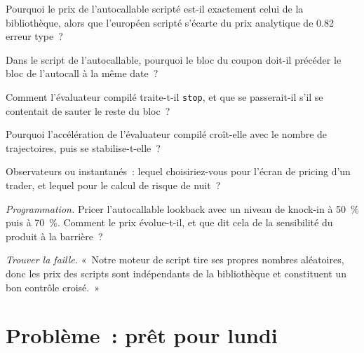 \begin{exercise}[$\star$]\label{exo:pl:pricing-library-architecture:2}
Pourquoi le prix de l'autocallable scripté est-il exactement celui de la bibliothèque, alors que l'européen scripté s'écarte du prix analytique de 0.82
erreur type~?
\end{exercise}

\begin{exercise}[$\star$]\label{exo:pl:pricing-library-architecture:3}
Dans le script de l'autocallable, pourquoi le bloc du coupon doit-il précéder le bloc de l'autocall à la même date~?
\end{exercise}

\begin{exercise}[$\star\star$]\label{exo:pl:pricing-library-architecture:4}
Comment l'évaluateur compilé traite-t-il \texttt{stop}, et que se passerait-il s'il se contentait de sauter le reste du bloc~?
\end{exercise}

\begin{exercise}[$\star\star$]\label{exo:pl:pricing-library-architecture:5}
Pourquoi l'accélération de l'évaluateur compilé croît-elle avec le nombre de trajectoires, puis se stabilise-t-elle~?
\end{exercise}

\begin{exercise}[$\star\star$]\label{exo:pl:pricing-library-architecture:6}
Observateurs ou instantanés~: lequel choisiriez-vous pour l'écran de pricing d'un trader, et lequel pour le calcul de risque de nuit~?
\end{exercise}

\begin{exercise}[$\star\star\star$]\label{exo:pl:pricing-library-architecture:7}
\emph{Programmation.} Pricer l'autocallable lookback avec un niveau de knock-in à 50~\% puis à 70~\%. Comment le prix évolue-t-il, et que dit cela
de la sensibilité du produit à la barrière~?
\end{exercise}

\begin{exercise}[$\star\star\star$]\label{exo:pl:pricing-library-architecture:8}
\emph{Trouver la faille.} «~Notre moteur de script tire ses propres nombres aléatoires, donc les prix des scripts sont indépendants de la bibliothèque et
constituent un bon contrôle croisé.~»
\end{exercise}

\section{Problème~: prêt pour lundi}


